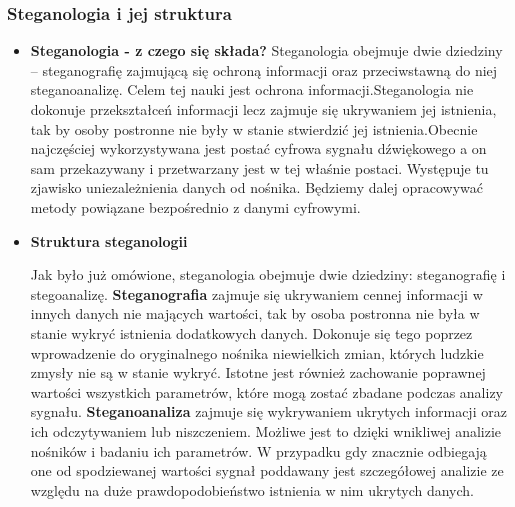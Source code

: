 \documentclass[a4paper,titleauthor]{mwart}
\begin{document}
\subsubsection{Steganologia i jej struktura}
 \begin{itemize}
	\item \textbf {Steganologia - z czego się składa?}\newline \newline
Steganologia obejmuje dwie dziedziny – steganografię zajmującą się ochroną informacji oraz przeciwstawną do niej steganoanalizę. Celem tej nauki jest ochrona informacji.\newline \newline  Steganologia nie dokonuje przekształceń informacji lecz zajmuje się ukrywaniem jej istnienia, tak by osoby postronne nie były w stanie stwierdzić jej istnienia.\newline \newline  Obecnie najczęściej wykorzystywana jest postać cyfrowa sygnału dźwiękowego a on sam przekazywany i przetwarzany jest w tej właśnie postaci. Występuje tu zjawisko uniezależnienia danych od nośnika. Będziemy dalej opracowywać metody powiązane bezpośrednio z danymi cyfrowymi.

	\item \textbf {Struktura steganologii}\newline \newline
	
	Jak było już omówione, steganologia obejmuje dwie dziedziny: steganografię i stegoanalizę.\newline \newline
	\textbf{Steganografia} zajmuje się ukrywaniem cennej informacji w innych danych nie mających wartości, tak by osoba postronna nie była w stanie wykryć istnienia dodatkowych danych. Dokonuje się tego poprzez wprowadzenie do oryginalnego nośnika niewielkich zmian, których ludzkie zmysły nie są w stanie wykryć. Istotne jest również zachowanie poprawnej wartości wszystkich parametrów, które mogą zostać zbadane podczas analizy sygnału. \newline \newline
	\textbf{Steganoanaliza} zajmuje się wykrywaniem ukrytych informacji oraz ich odczytywaniem lub niszczeniem. \newline Możliwe jest to dzięki wnikliwej analizie nośników i badaniu ich parametrów. W przypadku gdy znacznie odbiegają one od spodziewanej wartości sygnał poddawany jest szczegółowej analizie ze względu na duże prawdopodobieństwo istnienia w nim ukrytych danych. \newline
 \end{itemize}
\end{document}
